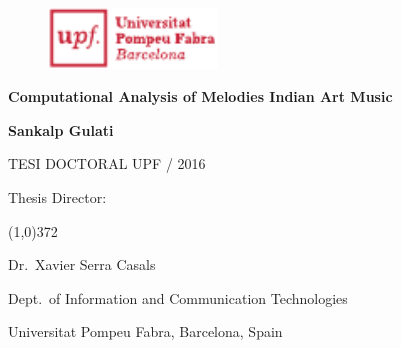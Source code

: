 
\newpage
\thispagestyle{empty}
\begin{titlingpage}
\begin{flushright}

  \begin{figure}[t]
    \begin{flushright}
      \includegraphics[width=4.5cm]{ch00/figures/upf-logo-bo}
    \end{flushright}
  \end{figure}

  \vspace*{2.2cm} 

  {\huge \textbf{Computational Analysis of Melodies Indian Art Music}}
  
  \vspace*{2cm}

  {\Large \textbf{Sankalp Gulati}}
  
  \vspace*{\fill} 
  TESI DOCTORAL UPF / 2016

\end{flushright}
  
  \vspace*{1.5cm}

  Thesis Director:

  \vspace*{-0.25cm}

  \line(1,0){372}
  
  \vspace*{0.25cm}

  Dr.~Xavier Serra Casals

  Dept.~of Information and Communication Technologies

  Universitat Pompeu Fabra, Barcelona, Spain
  
\end{titlingpage}

